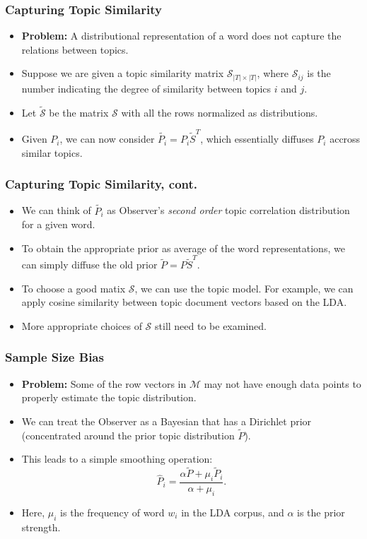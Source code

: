 \documentclass{beamer}
\newcommand\cS{{\mathcal S}}
\newcommand\cM{{\mathcal M}}
\begin{document}
\begin{frame}
\frametitle{Capturing Topic Similarity}
\begin{itemize}
\item {\bf Problem:} A distributional representation of a word does
  not capture the relations between topics.
\item Suppose we are given a topic similarity matrix
  $\cS_{|T|\times|T|}$, where $\cS_{ij}$ is the number indicating
  the degree of similarity between topics $i$ and $j$. 
\item Let $\tilde{\cS}$ be the matrix $\cS$ with all the rows normalized as
  distributions. 
\item Given $P_i$, we can now consider $\tilde{P_i}=P_i\tilde{S}^T$, which
  essentially diffuses $P_i$ accross similar topics.
\end{itemize}
\end{frame}

\begin{frame}
\frametitle{Capturing Topic Similarity, cont.}
\begin{itemize}
\item We can think of $\tilde{P_i}$ as Observer's {\em second order}
  topic correlation distribution for a given word.
\item To obtain the appropriate prior as average of the word
  representations, we can simply diffuse the old prior
  $\tilde{P}=P\tilde{S}^T$. 
\item To choose a good matix $\cS$, we can use the topic model. For
  example, we can apply cosine similarity between topic document
  vectors based on the LDA. 
\item More appropriate choices of $\cS$ still need to be examined.
\end{itemize}
\end{frame}

\begin{frame}
\frametitle{Sample Size Bias}
\begin{itemize}
\item {\bf Problem:} Some of the row vectors in $\cM$ may not have
  enough data points to properly estimate the topic distribution.
\item We can treat the Observer as a Bayesian that has a Dirichlet
  prior (concentrated around the prior topic distribution
  $\tilde{P}$). 
\item This leads to a simple smoothing operation:
\begin{equation}
\widehat{P}_i=\frac{\alpha \tilde{P}+ \mu_i \tilde{P}_i}{\alpha+\mu_i}.
\end{equation}
\item Here, $\mu_i$ is the frequency of word $w_i$ in the LDA corpus,
  and $\alpha$ is the prior strength.
\end{itemize}
\end{frame}
\end{document}
